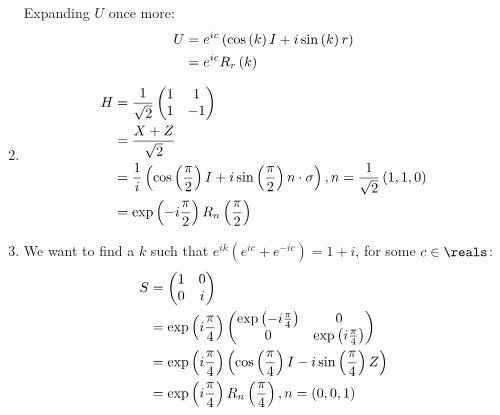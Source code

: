 \begin{enumerate}
%
Expanding $U$ once more:
%
\begin{align}
U &= e^{ic} \left( \cos \left( k \right) I + i \sin \left( k \right) r \right) \\
&= e^{ic} R_r \left( k \right)
\end{align}
%
\item \begin{align}
H &= \frac{1}{\sqrt{2}} \begin{pmatrix} 1 & 1 \\ 1 & -1 \end{pmatrix} \\
&= \frac{X + Z}{\sqrt{2}} \\
&= \frac1i \left( \cos \left( \frac{\pi}{2} \right) I + i \sin \left( \frac{\pi}{2} \right) n \cdot \sigma \right), n = \frac{1}{\sqrt{2}} \left( 1, 1, 0 \right) \\
&= \exp \left( -i \frac{\pi}{2} \right) R_n \left( \frac{\pi}{2} \right)
\end{align}
%
\item We want to find a $k$ such that $e^{ik} \left( e^{ic} + e^{-ic} \right) = 1 + i$, for some $c \in \reals$:
%
\begin{align}
S &= \begin{pmatrix} 1 & 0 \\ 0 & i \end{pmatrix} \\
&= \exp \left( i \frac{\pi}{4} \right) \begin{pmatrix} \exp \left( -i \frac{\pi}{4} \right) & 0 \\ 0 & \exp \left( i \frac{\pi}{4} \right) \end{pmatrix} \\
&= \exp \left( i \frac{\pi}{4} \right) \left( \cos \left( \frac{\pi}{4} \right) I - i \sin \left( \frac{\pi}{4} \right) Z \right) \\
&= \exp \left( i \frac{\pi}{4} \right) R_n \left( \frac{\pi}{4} \right), n = \left(0, 0, 1 \right)
\end{align}
\end{enumerate}
\endgroup
